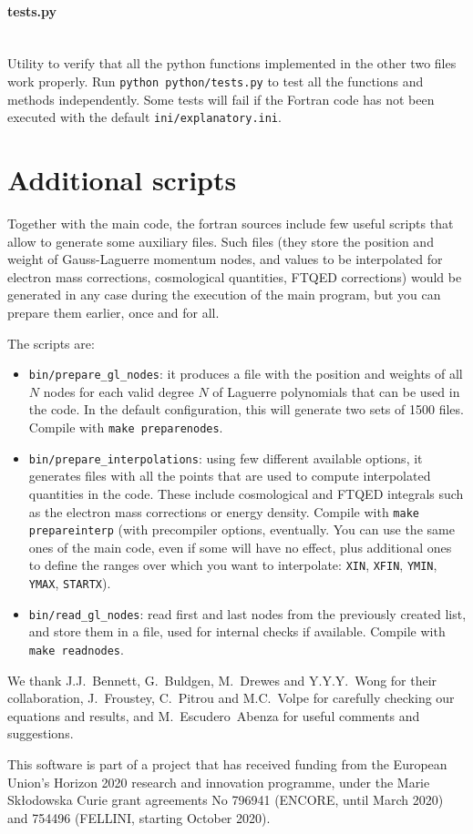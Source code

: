 \documentclass[notitlepage,nofootinbib,showpacs,preprintnumbers,amsmath,amssymb,superscriptaddress,prd,onecolumn]{revtex4-1}
\begin{document}
\smallskip
\paragraph{tests.py}~\\
Utility to verify that all the python functions implemented in the other two files work properly.
Run \texttt{python python/tests.py} to test all the functions and methods independently.
Some tests will fail if the Fortran code has not been executed
with the default \texttt{ini/explanatory.ini}.


\section{Additional scripts}
\label{ssec:scripts}
Together with the main code, the fortran sources include few useful scripts that allow to generate some auxiliary files.
Such files (they store the position and weight of Gauss-Laguerre momentum nodes, and values to be interpolated for electron mass corrections, cosmological quantities, FTQED corrections) would be generated in any case during the execution of the main program, but you can prepare them earlier, once and for all.

The scripts are:
\begin{itemize}
\item \texttt{bin/prepare\_gl\_nodes}:
it produces a file with the position and weights of all $N$ nodes for each valid degree $N$ of Laguerre polynomials that can be used in the code.
In the default configuration, this will generate two sets of 1500 files.
Compile with \texttt{make preparenodes}.
\item \texttt{bin/prepare\_interpolations}: using few different available options,
it generates files with all the points that are used to compute interpolated quantities in the code.
These include cosmological and FTQED integrals such as the electron mass corrections or energy density.
Compile with \texttt{make prepareinterp} (with precompiler options, eventually.
You can use the same ones of the main code, even if some will have no effect,
plus additional ones to define the ranges over which you want to interpolate: \texttt{XIN}, \texttt{XFIN}, \texttt{YMIN}, \texttt{YMAX}, \texttt{STARTX}).
\item \texttt{bin/read\_gl\_nodes}: read first and last nodes from the previously created list, and store them in a file, used for internal checks if available. Compile with \texttt{make readnodes}.
\end{itemize}



\acknowledgments
We thank J.J.~Bennett, G.~Buldgen, M.~Drewes and Y.Y.Y.~Wong for their collaboration,
J.~Froustey, C.~Pitrou and M.C.~Volpe for carefully checking our equations and results,
and M.~Escudero~Abenza for useful comments and suggestions.

This software is part of a project that has received funding from the European Union's Horizon 2020 research and innovation programme, under the Marie Sk{\l}odowska Curie grant agreements No
796941 (ENCORE, until March 2020) and
754496 (FELLINI, starting October 2020).




\end{document}
